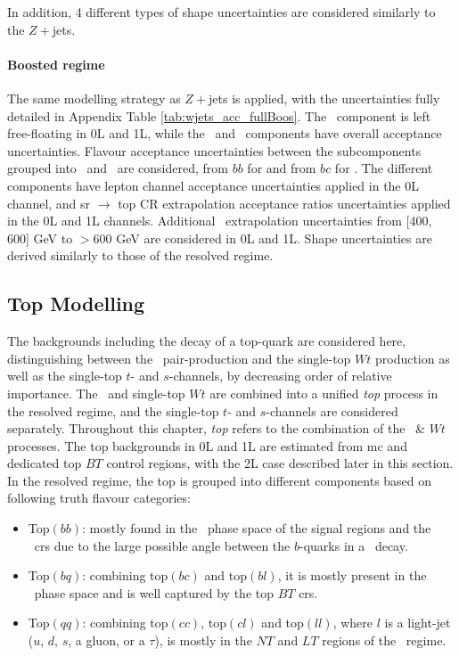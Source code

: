 In addition, 4 different types of shape uncertainties are considered similarly to the $Z+$jets.

\paragraph{Boosted regime} The same modelling strategy as $Z+$jets is applied, with the uncertainties fully detailed in Appendix Table \ref{tab:wjets_acc_fullBoos}. The \whf\ component is left free-floating in 0L and 1L, while the \wmf\ and \wlf\ components have overall acceptance uncertainties. Flavour acceptance uncertainties between the subcomponents grouped into \whf\ and  \wmf\ are considered, from $bb$ for \whf and from $bc$ for \wmf. The different components have lepton channel acceptance uncertainties applied in the 0L channel, and \gls{sr} $\rightarrow$ top CR extrapolation acceptance ratios uncertainties applied in the 0L and 1L channels. Additional \ptv\ extrapolation uncertainties from [400, 600] GeV to $> 600$ GeV are considered in 0L and 1L. Shape uncertainties are derived similarly to those of the resolved regime. 

\subsection{Top Modelling}\label{sec-modTop} 
The backgrounds including the decay of a top-quark are considered here, distinguishing between the \ttb\ pair-production and the single-top $Wt$ production as well as the single-top $t$- and $s$-channels, by decreasing order of relative importance. The \ttb\ and single-top $Wt$ are combined into a unified \textit{top} process in the resolved regime, and the single-top $t$- and $s$-channels are considered separately. Throughout this chapter, \textit{top} refers to the combination of the \ttb\ \& $Wt$ processes. The top backgrounds in 0L and 1L are estimated from \gls{mc} and dedicated top $BT$ control regions, with the 2L case described later in this section. In the resolved regime, the top is grouped into different components based on following truth flavour categories:
\begin{itemize}
    \item Top$(bb)$: mostly found in the \vhb\ phase space of the signal regions and the \highdr\ \glspl{cr} due to the large possible angle between the $b$-quarks in a \ttb\ decay. 
    \item Top$(bq)$: combining top$(bc)$ and top$(bl)$, it is mostly present in the \vhc\ phase space and is well captured by the top $BT$ \glspl{cr}.
    \item Top$(qq)$: combining top$(cc)$, top$(cl)$ and top$(ll)$, where $l$ is a light-jet ($u$, $d$, $s$, a gluon, or a $\tau$), is mostly in the $NT$ and $LT$ regions of the \vhc\ regime. 
\end{itemize}

